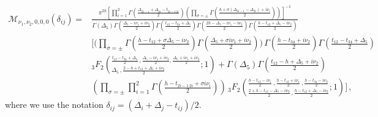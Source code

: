 \begin{align}
  \mathcal{M}_{\nu_1, \nu_2,0,0,0}(\delta_{ij})= & {\textstyle\frac{\pi^{2h}\left[\prod_{i=1}^{2}\Gamma\left(\frac{\Delta_{2i-1}+\Delta_{2i}-t_{2i-1\,2i}}{2}\right)\left(\prod_{\sigma=\pm}\Gamma\left(\frac{h+\sigma \left(\Delta_{2i-1}-\Delta_{2i}\right)+i \nu_i}{2}\right)\right)\right]^{-1}}{\Gamma \left(\Delta _5\right) \Gamma \left(\frac{\Delta _5-i \nu _1+i \nu _2}{2}\right) \Gamma \left(\frac{t_{12}-t_{34}+\Delta _5}{2}\right) \Gamma \left(\frac{2 h-\Delta _5-i \nu _1-i \nu _2}{2}\right) \Gamma\! \left(\frac{h-t_{12}+\Delta _5-i \nu _2}{2}\right)}}\nonumber \\
                                       & {\textstyle\bigg[\Big(\prod_{\sigma=\pm}\Gamma\!\left(\frac{h-t_{12}+\sigma\Delta_5-i \nu_2}{2}\right)\Gamma\!\left(\frac{\Delta_5+\sigma i \nu_1+i \nu_2}{2}\right)\!\Big)\,\Gamma\!\left(\frac{h-t_{34}+i \nu_2}{2}\right)\Gamma\!\left(\frac{t_{12}-t_{34}+\Delta_5}{2}\right)}\nonumber                                                                                                                                                                                                                                          \\
                                       & {\textstyle\left. _3F_2\left(_{\Delta_5\,,\frac{2-h+t_{12}+\Delta_5+i\nu_2}{2}}^{\frac{t_{12}-t_{34}+\Delta_5}{2}\,,\frac{\Delta_5-i \nu_1+i \nu_2}{2},\frac{\Delta_5+i \nu_1+i \nu_2}{2}};1\right)+\Gamma\!\left(\Delta_5\right)\Gamma\!\left(\frac{t_{12}-h+\Delta_5+i \nu_2}{2}\right)\right.}\label{eq:scalarpartialMellin}                                                                                                                                                                                                      \\
                                       & {\textstyle \left(\prod_{\sigma=\pm}\prod_{i=1}^{2}\Gamma\!\left(\frac{h-t_{2i-1\,2i}+\sigma i\nu_i}{2}\right)\right)\,_3F_2\left(_{\frac{2+h-t_{12}-\Delta_5-i\nu_2}{2}\,,\frac{h-t_{12}+\Delta_5-i\nu_2}{2}}^{\frac{h-t_{12}-i\nu_1}{2}\,,\frac{h-t_{12}+i\nu_1}{2}\,,\frac{h-t_{34}-i\nu_2}{2}};1\right)\bigg]}\,,\nonumber
\end{align}
where we use the notation $\delta_{ij}=(\Delta_i+\Delta_j-t_{ij})/2$.
